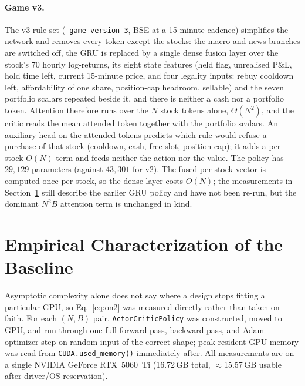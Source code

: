 \documentclass[11pt]{article}
\newcommand{\code}[1]{\texttt{#1}}
\begin{document}
\paragraph{Game v3.} The v3 rule set (\code{--game-version 3}, BSE at a 15-minute cadence)
simplifies the network and removes every token except the stocks: the macro and news
branches are switched off, the GRU is replaced by a single dense fusion layer over the
stock's $70$ hourly log-returns, its eight state features (held flag, unrealised P\&L, hold
time left, current 15-minute price, and four legality inputs: rebuy cooldown left, affordability
of one share, position-cap headroom, sellable) and the seven portfolio scalars repeated beside it, and
there is neither a cash nor a portfolio token. Attention therefore runs over the $N$ stock
tokens alone, $\Theta(N^2)$, and the critic reads the mean attended token together with the
portfolio scalars. An auxiliary head on the attended tokens predicts which rule would refuse a purchase of that
stock (cooldown, cash, free slot, position cap); it adds a per-stock $O(N)$ term and feeds neither the action
nor the value. The policy has $29{,}129$ parameters (against $43{,}301$ for v2). The
fused per-stock vector is computed once per stock, so the dense layer costs $O(N)$; the
measurements in Section~\ref{sec:measurement} still describe the earlier GRU policy and have
not been re-run, but the dominant $N^2 B$ attention term is unchanged in kind.

\section{Empirical Characterization of the Baseline}
\label{sec:measurement}

Asymptotic complexity alone does not say where a design stops fitting a
particular GPU, so Eq.~\eqref{eq:on2} was measured directly rather than
taken on faith. For each $(N,B)$ pair, \code{ActorCriticPolicy} was
constructed, moved to GPU, and run through one full forward pass, backward
pass, and Adam optimizer step \citep{kingma2015adam} on random input of the
correct shape; peak resident GPU memory was read from
\code{CUDA.used\_memory()} immediately after. All measurements are on a
single NVIDIA GeForce RTX~5060~Ti (16.72\,GB total, $\approx$15.57\,GB
usable after driver/OS reservation).
\end{document}
